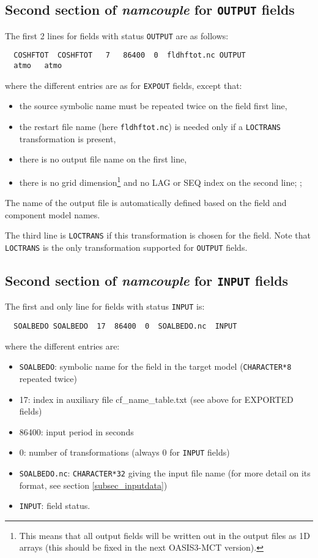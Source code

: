 \subsection{Second section of {\it namcouple} for {\tt OUTPUT} fields}
\label{subsubsec_secondOUTPUT}
The first 2 lines for fields with status {\tt OUTPUT} are as follows:
  \begin{verbatim}
  COSHFTOT  COSHFTOT   7   86400  0  fldhftot.nc OUTPUT 
  atmo   atmo 
\end{verbatim}
where the different entries are as for {\tt EXPOUT} fields, except
that:
\begin{itemize}
\item the source symbolic name must be repeated twice on the field
  first line,
\item the restart file name (here {\tt fldhftot.nc}) is needed only if
  a {\tt LOCTRANS} transformation is present,
\item there is no output file name on the first line,
\item there is no grid dimension\footnote{This means that all output
    fields will be written out in the output files as 1D arrays (this
    should be fixed in the next OASIS3-MCT version).} and no LAG or SEQ
  index on the second line; ;
\end{itemize}
The name of the output file is automatically defined based on the
field and component model names.

The third line is {\tt LOCTRANS} if this transformation is chosen for
the field. Note that {\tt LOCTRANS} is the only transformation
supported for {\tt OUTPUT} fields.

\subsection{Second section of {\it namcouple} for {\tt INPUT} fields}
\label{subsubsec_secondINPUT}

The first and only line for fields with status {\tt INPUT} is:

  \begin{verbatim}
  SOALBEDO SOALBEDO  17  86400  0  SOALBEDO.nc  INPUT
  \end{verbatim}
\vspace{-0.5cm}
where the different entries are:
\begin{itemize}
\item {\tt SOALBEDO}: symbolic name for the field in the target model
  ({\tt CHARACTER*8} repeated twice)
\item 17: index in auxiliary file cf\_name\_table.txt (see above for
  EXPORTED fields)
\item 86400: input period in seconds
\item 0: number of transformations (always 0 for {\tt INPUT} fields)
\item {\tt SOALBEDO.nc}: {\tt CHARACTER*32} giving the input file name
  (for more detail on its format, see section \ref{subsec_inputdata})
\item {\tt INPUT}: field status.
\end{itemize}

